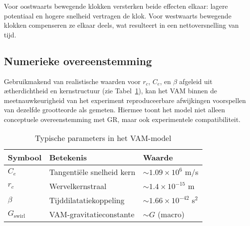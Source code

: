Voor oostwaarts bewegende klokken versterken beide effecten elkaar: lagere potentiaal en hogere snelheid vertragen de klok. Voor westwaarts bewegende klokken compenseren ze elkaar deels, wat resulteert in een nettoversnelling van tijd.

\subsection{Numerieke overeenstemming}

Gebruikmakend van realistische waarden voor $r_c$, $C_e$, en $\beta$ afgeleid uit ætherdichtheid en kernstructuur (zie Tabel~\ref{tab:constants}), kan het VAM binnen de meetnauwkeurigheid van het experiment reproduceerbare afwijkingen voorspellen van dezelfde grootteorde als gemeten. Hiermee toont het model niet alleen conceptuele overeenstemming met GR, maar ook experimentele compatibiliteit.

\begin{table}[h!]
\centering
\caption{Typische parameters in het VAM-model}
\label{tab:constants}
\begin{tabular}{lll}
\toprule
Symbool & Betekenis & Waarde \\
\midrule
$C_e$ & Tangentiële snelheid kern & $\sim 1.09 \times 10^6$ m/s \\
$r_c$ & Wervelkernstraal & $\sim 1.4 \times 10^{-15}$ m \\
$\beta$ & Tijddilatatiekoppeling & $\sim 1.66 \times 10^{-42}$ s$^2$ \\
$G_\text{swirl}$ & VAM-gravitatieconstante & $\sim G$ (macro) \\
\bottomrule
\end{tabular}
\end{table}